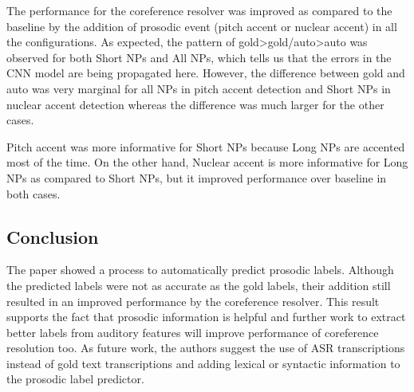 \documentclass[a4paper]{article}
\begin{document}
The performance for the coreference resolver was improved as compared to the baseline by the addition of prosodic event (pitch accent or nuclear accent) in all the configurations. As expected, the pattern of gold>gold/auto>auto was observed for both Short NPs and All NPs, which tells us that the errors in the CNN model are being propagated here. However, the difference between gold and auto was very marginal for all NPs in pitch accent detection and Short NPs in nuclear accent detection whereas the difference was much larger for the other cases.

Pitch accent was more informative for Short NPs because Long NPs are accented most of the time. On the other hand, Nuclear accent is more informative for Long NPs as compared to Short NPs, but it improved performance over baseline in both cases.



\subsection{Conclusion}
The paper showed a process to automatically predict prosodic labels. Although the predicted labels were not as accurate as the gold labels, their addition still resulted in an improved performance by the coreference resolver. This result supports the fact that prosodic information is helpful and further work to extract better labels from auditory features will improve performance of coreference resolution too. As future work, the authors suggest the use of ASR transcriptions instead of gold text transcriptions and adding lexical or syntactic information to the prosodic label predictor.





\end{document}

